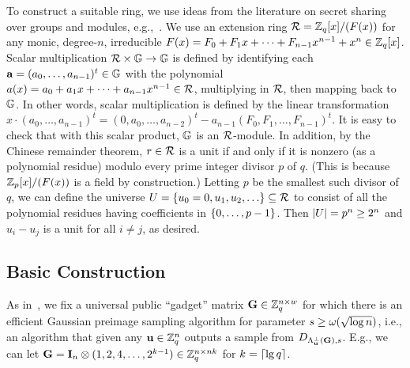 To construct a suitable ring, we use ideas from the literature on
secret sharing over groups and modules,
e.g.,~\cite{DBLP:journals/siamdm/DesmedtF94,Fehr98}.  We use an
extension ring $\mathcal{R}=\mathbb{Z}_q[x]/(F(x))$ for any monic, degree-$n$,
irreducible $F(x) = F_{0}+F_{1}x + \cdots + F_{n-1}x^{n-1} + x^{n} \in
\mathbb{Z}_q[x]$.  Scalar multiplication $\mathcal{R} \times \mathbb{G} \to \mathbb{G}$ is defined by
identifying each $\mathbf{a} = (a_{0}, \ldots, a_{n-1})^{t} \in \mathbb{G}$ with
the polynomial $a(x) = a_{0} + a_{1}x + \cdots + a_{n-1}x^{n-1} \in
\mathcal{R}$, multiplying in $\mathcal{R}$, then mapping back to $\mathbb{G}$.  In other
words, scalar multiplication is defined by the linear transformation
$x \cdot (a_{0}, \ldots, a_{n-1})^{t} = (0, a_{0}, \ldots,
a_{n-2})^{t} - a_{n-1}(F_{0}, F_{1}, \ldots, F_{n-1})^{t}$.  It is
easy to check that with this scalar product, $\mathbb{G}$ is an
$\mathcal{R}$-module.  In addition, by the Chinese remainder theorem, $r \in
\mathcal{R}$ is a unit if and only if it is nonzero (as a polynomial
residue) modulo every prime integer divisor $p$ of $q$.  (This is
because $\mathbb{Z}_{p}[x]/(F(x))$ is a field by construction.)  Letting $p$
be the smallest such divisor of $q$, we can define the universe $U =
\{{u_{0}=0, u_{1}, u_{2}, \ldots}\} \subseteq \mathcal{R}$ to consist of all
the polynomial residues having coefficients in $\{{0, \ldots, p-1}\}$.
Then $\lvert{U}\rvert = p^{n} \geq 2^{n}$ and $u_{i}-u_{j}$ is a unit for all
$i \neq j$, as desired.

\subsection{Basic Construction}
\label{sec:basic-construction}

As in~\cite{DBLP:conf/eurocrypt/MicciancioP12}, we fix a universal public
``gadget'' matrix $\mathbf{G} \in \mathbb{Z}_q^{n \times w}$ for which there is an
efficient Gaussian preimage sampling algorithm for parameter $s \geq
\omega(\sqrt{\log n})$, i.e., an algorithm that given any $\mathbf{u} \in \mathbb{Z}_q^{n}$ outputs
a sample from $D_{\Lambda^{\perp}_{\mathbf{u}}(\mathbf{G}), s}$.  E.g., we can let
$\mathbf{G} = \mathbf{I}_{n} \otimes (1, 2, 4, \ldots, 2^{k-1}) \in \mathbb{Z}_q^{n
  \times nk}$ for $k = \lceil{\lg q}\rceil$.

